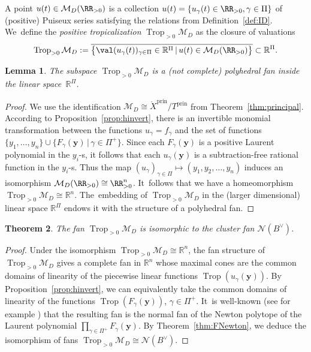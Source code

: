 \documentclass[10pt,a4paper]{amsart}
\def\R{{\mathbb R}}
\def\Xo{{\mathring{X}}}
\def\prin{{\operatorname{prin}}}
\def\M{{\mathcal{M}}}
\def\y{{\mathbf y}}
\def\N{{\mathcal{N}}}
\def\Trop{\operatorname{Trop}}
\numberwithin{equation}{section}
\newtheorem{Theorem}{Theorem}[section]
\newtheorem{Lemma}[Theorem]{Lemma}
\begin{document}
A point $u(t) \in \M_D(\RR_{>0})$ is a collection $u(t) = \{u_\gamma(t) \in \RR_{>0}, \gamma \in \Pi\}$ of (positive) Puiseux series satisfying the relations from Definition~\ref{def:ID}. We~define the \emph{positive tropicalization} $\Trop_{>0} \M_D$ as the closure of valuations
\begin{gather*}
\Trop_{>0} \M_D := \overline{\big\{\val(u_\gamma(t))_{ \gamma \in \Pi}\in \R^\Pi \,|\, u(t) \in \M_D(\RR_{>0})\big\}} \subset \R^\Pi.
\end{gather*}
\begin{Lemma}
The subspace $\Trop_{>0} \M_D$ is a (not complete) polyhedral fan inside the linear space~$\R^\Pi$.
\end{Lemma}
\begin{proof}
We use the identification $\M_D \cong \Xo^\prin/T^\prin$ from Theorem~\ref{thm:principal}. According to Proposition~\ref{prop:hinvert}, there is an invertible monomial transformation between the functions $u_\gamma = f_\gamma$ and the set of functions $\{y_1,\dots,y_n\} \cup \{ F_\gamma(\y) \,|\, \gamma \in \Pi^+\}$. Since each $F_\gamma(\y)$ is a positive Laurent polynomial in the $y_i$-s, it follows that each $u_\gamma(\y)$ is a subtraction-free rational function in the $y_i$-s. Thus the map $(u_\gamma)_{\gamma \in \Pi} \mapsto (y_1,y_2,\dots,y_n)$ induces an isomorphism $\M_D(\RR_{>0}) \cong \RR_{>0}^n$. It~follows that we have a homeomorphism $\Trop_{>0}\M_D \cong \R^n$. The~embedding of $\Trop_{>0}\M_D$ in the (larger dimensional) linear space $\R^\Pi$ endows it with the structure of a polyhedral fan.
\end{proof}

\begin{Theorem}\label{thm:tropMD}
The fan $\Trop_{>0}\M_D$ is isomorphic to the cluster fan $\N(B^\vee)$.
\end{Theorem}
\begin{proof}
Under the isomorphism $\Trop_{>0}\M_D \cong \R^n$, the fan structure of $\Trop_{>0}\M_D$ gives a complete fan in $\R^n$ whose maximal cones are the common domains of linearity of the piecewise linear functions $\Trop(u_\gamma(\y))$. By Proposition~\ref{prop:hinvert}, we can equivalently take the common domains of linearity of the functions $\Trop(F_\gamma(\y))$, $\gamma \in \Pi^+$. It~is well-known (see for example \cite[Section~11.1]{ALS2}) that the resulting fan is the normal fan of the Newton polytope of the Laurent polynomial $\prod_{\gamma \in \Pi^+} F_\gamma(\y)$. By Theorem~\ref{thm:FNewton}, we deduce the isomorphism of fans $\Trop_{>0}\M_D \cong \N(B^\vee)$.
\end{proof}
\end{document}
